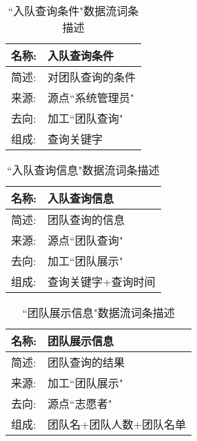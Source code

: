 \begin{table}[H]  
\caption{``入队查询条件"数据流词条描述}  
\begin{center}  
    \begin{tabular}{l p{11cm}} 
        \hline
        \quad 名称:  &   入队查询条件 \\
        \hline
        \quad 简述:  & 对团队查询的条件 \\
        \hline
        \quad 来源:  & 源点``系统管理员" \\
        \hline
        \quad 去向:  & 加工``团队查询" \\
        \hline
        \quad 组成:  & 查询关键字 \\
        \hline
    \end{tabular}
    \label{tab1}
\end{center}
\end{table}

\begin{table}[H]  
\caption{``入队查询信息"数据流词条描述}  
\begin{center}  
    \begin{tabular}{l p{11cm}} 
        \hline
        \quad 名称:  &   入队查询信息 \\
        \hline
        \quad 简述:  & 团队查询的信息 \\
        \hline
        \quad 来源:  & 源点``团队查询" \\
        \hline
        \quad 去向:  & 加工``团队展示" \\
        \hline
        \quad 组成:  & 查询关键字+查询时间 \\
        \hline
    \end{tabular}
    \label{tab1}
\end{center}
\end{table}

\begin{table}[H]  
\caption{``团队展示信息"数据流词条描述}  
\begin{center}  
    \begin{tabular}{l p{11cm}} 
        \hline
        \quad 名称:  &   团队展示信息 \\
        \hline
        \quad 简述:  & 团队查询的结果 \\
        \hline
        \quad 来源:  & 加工``团队展示" \\
        \hline
        \quad 去向:  & 源点``志愿者" \\
        \hline
        \quad 组成:  & 团队名+团队人数+团队名单 \\
        \hline
    \end{tabular}
    \label{tab1}
\end{center}
\end{table}

